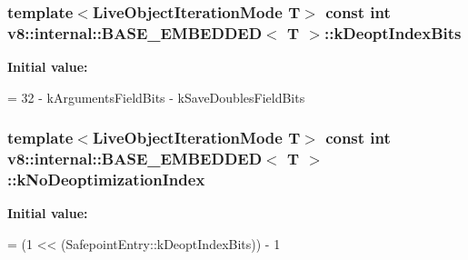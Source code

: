 \subsubsection[{\texorpdfstring{k\+Deopt\+Index\+Bits}{kDeoptIndexBits}}]{\setlength{\rightskip}{0pt plus 5cm}template$<$Live\+Object\+Iteration\+Mode T$>$ const int {\bf v8\+::internal\+::\+B\+A\+S\+E\+\_\+\+E\+M\+B\+E\+D\+D\+ED}$<$ T $>$\+::k\+Deopt\+Index\+Bits\hspace{0.3cm}{\ttfamily [static]}}\hypertarget{classv8_1_1internal_1_1_b_a_s_e___e_m_b_e_d_d_e_d_a1831659abd0d70d0d1f8e00521582479}{}\label{classv8_1_1internal_1_1_b_a_s_e___e_m_b_e_d_d_e_d_a1831659abd0d70d0d1f8e00521582479}
{\bfseries Initial value\+:}
\begin{DoxyCode}
=
      32 - kArgumentsFieldBits - kSaveDoublesFieldBits
\end{DoxyCode}
\subsubsection[{\texorpdfstring{k\+No\+Deoptimization\+Index}{kNoDeoptimizationIndex}}]{\setlength{\rightskip}{0pt plus 5cm}template$<$Live\+Object\+Iteration\+Mode T$>$ const int {\bf v8\+::internal\+::\+B\+A\+S\+E\+\_\+\+E\+M\+B\+E\+D\+D\+ED}$<$ T $>$\+::k\+No\+Deoptimization\+Index\hspace{0.3cm}{\ttfamily [static]}}\hypertarget{classv8_1_1internal_1_1_b_a_s_e___e_m_b_e_d_d_e_d_a3803cb2d657f13c54487445475d94c5c}{}\label{classv8_1_1internal_1_1_b_a_s_e___e_m_b_e_d_d_e_d_a3803cb2d657f13c54487445475d94c5c}
{\bfseries Initial value\+:}
\begin{DoxyCode}
=
      (1 << (SafepointEntry::kDeoptIndexBits)) - 1
\end{DoxyCode}
